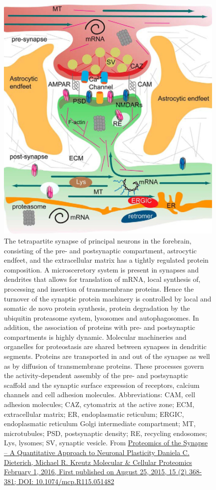 \begin{figure}

{\centering \includegraphics[width=0.7\linewidth]{./figures/synapse/synapse_diagram} 

}

\caption{The tetrapartite synapse of principal neurons in the forebrain, consisting of the pre- and postsynaptic compartment, astrocytic endfeet, and the extracellular matrix has a tightly regulated protein composition. A microsceretory system is present in synapses and dendrites that allows for translation of mRNA, local synthesis of, processing and insertion of transmembrane proteins. Hence the turnover of the synaptic protein machinery is controlled by local and somatic de novo protein synthesis, protein degradation by the ubiquitin proteasome system, lysosomes and autophagosomes. In addition, the association of proteins with pre- and postsynaptic compartments is highly dynamic. Molecular machineries and organelles for proteostasis are shared between synapses in dendritic segments. Proteins are transported in and out of the synapse as well as by diffusion of transmembrane proteins. These processes govern the activity-dependent assembly of the pre- and postsynaptic scaffold and the synaptic surface expression of receptors, calcium channels and cell adhesion molecules. Abbreviations: CAM, cell adhesion molecules; CAZ, cytomatrix at the active zone; ECM, extracellular matrix; ER, endoplasmatic reticulum; ERGIC, endoplasmatic reticulum Golgi intermediate compartment; MT, microtubules; PSD, postsynaptic density; RE, recycling endosomes; Lys, lysomes; SV, synaptic vesicle. From \href{https://doi.org/10.1074/mcp.R115.051482}{Proteomics of the Synapse -- A Quantitative Approach to Neuronal Plasticity Daniela C. Dieterich, Michael R. Kreutz Molecular \& Cellular Proteomics February 1, 2016, First published on August 25, 2015, 15 (2) 368-381; DOI: 10.1074/mcp.R115.051482}}\label{fig:synapsediagram}
\end{figure}

